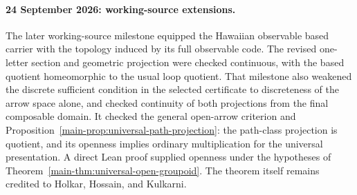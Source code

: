 \documentclass[10pt,reqno]{amsart}
\theoremstyle{definition}
\theoremstyle{plain}
\theoremstyle{remark}
\begin{document}
\paragraph{24 September 2026: working-source extensions.}
The later working-source milestone equipped the Hawaiian
observable based carrier with the topology induced by its full observable
code.  The revised one-letter section and geometric projection were checked
continuous, with the based quotient homeomorphic to the usual loop quotient.
That milestone also weakened the discrete sufficient condition in the
selected certificate to discreteness of the arrow space alone, and checked
continuity of both projections from the final composable domain. It checked
the general open-arrow criterion and
Proposition~\ref{main-prop:universal-path-projection}: the path-class projection
is quotient, and its openness implies ordinary multiplication for the
universal presentation. A direct Lean proof supplied openness under
the hypotheses of Theorem~\ref{main-thm:universal-open-groupoid}. The theorem
itself remains credited to Holkar, Hossain, and Kulkarni.
\end{document}
